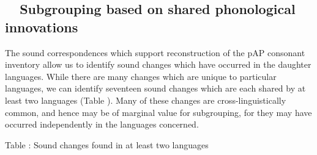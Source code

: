 \subsection[\ \ Subgrouping based on shared phonological innovations]{\ \ Subgrouping based on shared phonological innovations}
\hypertarget{RefHeading49931871885726}{}The sound correspondences which support reconstruction of the pAP consonant inventory allow us to identify sound changes which have occurred in the daughter languages. While there are many changes which are unique to particular languages, we can identify seventeen sound changes which are each shared by at least two languages (Table ). Many of these changes are cross-linguistically common, and hence may be of marginal value for subgrouping, for they may have occurred independently in the languages concerned. 

{\centering
\label{bkm:Ref214242512}Table : Sound changes found in at least two languages 
\par}

